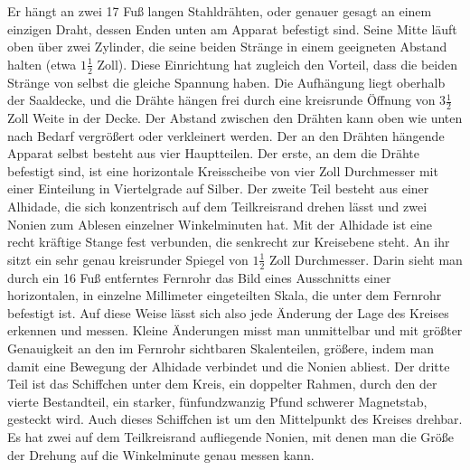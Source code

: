Er hängt an zwei 17 Fuß langen Stahldrähten, oder genauer gesagt an einem einzigen Draht, dessen Enden unten am Apparat befestigt sind. Seine Mitte läuft oben über zwei Zylinder, die seine beiden Stränge in einem geeigneten Abstand halten (etwa $1\frac{1}{2}$ Zoll). Diese Einrichtung hat zugleich den Vorteil, dass die beiden Stränge von selbst die gleiche Spannung haben. Die Aufhängung liegt oberhalb der Saaldecke, und die Drähte hängen frei durch eine kreisrunde Öffnung von $3\frac{1}{2}$ Zoll Weite in der Decke. Der Abstand zwischen den Drähten kann oben wie unten nach Bedarf vergrößert oder verkleinert werden. Der an den Drähten hängende Apparat selbst besteht aus vier Hauptteilen. Der erste, an dem die Drähte befestigt sind, ist eine horizontale Kreisscheibe von vier Zoll Durchmesser mit einer Einteilung in Viertelgrade auf Silber. Der zweite Teil besteht aus einer Alhidade, die sich konzentrisch auf dem Teilkreisrand drehen lässt und zwei Nonien zum Ablesen einzelner Winkelminuten hat. Mit der Alhidade ist eine recht kräftige Stange fest verbunden, die senkrecht zur Kreisebene steht. An ihr sitzt ein sehr genau kreisrunder Spiegel von $1\frac{1}{2}$ Zoll Durchmesser. Darin sieht man durch ein 16 Fuß entferntes Fernrohr das Bild eines Ausschnitts einer horizontalen, in einzelne Millimeter eingeteilten Skala, die unter dem Fernrohr befestigt ist. Auf diese Weise lässt sich also jede Änderung der Lage des Kreises erkennen und messen. Kleine Änderungen misst man unmittelbar und mit größter Genauigkeit an den im Fernrohr sichtbaren Skalenteilen, größere, indem man damit eine Bewegung der Alhidade verbindet und die Nonien abliest. Der dritte Teil ist das Schiffchen unter dem Kreis, ein doppelter Rahmen, durch den der vierte Bestandteil, ein starker, fünfundzwanzig Pfund schwerer Magnetstab, gesteckt wird. Auch dieses Schiffchen ist um den Mittelpunkt des Kreises drehbar. Es hat zwei auf dem Teilkreisrand aufliegende Nonien, mit denen man die Größe der Drehung auf die Winkelminute genau messen kann.

